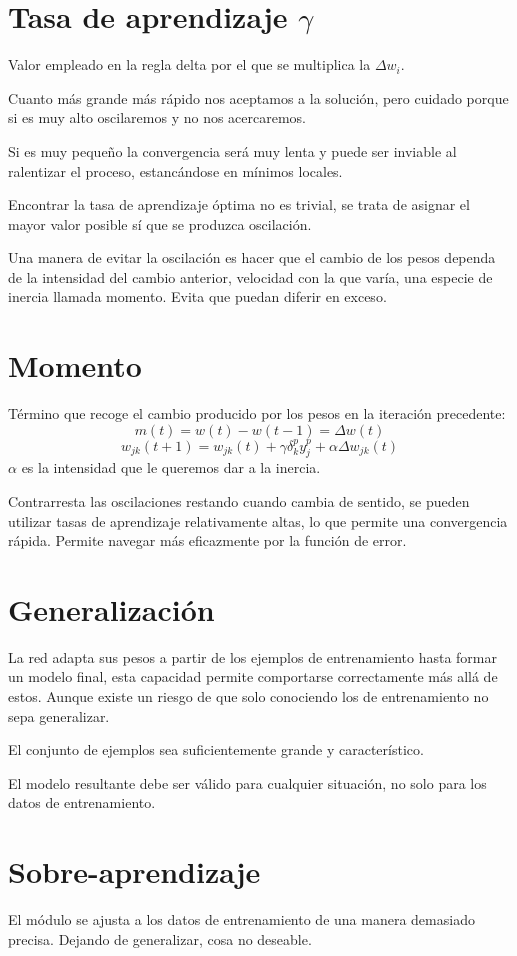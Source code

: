 \documentclass[12pt, twoside, openright]{report} %
\begin{document}
\section{Tasa de aprendizaje $\gamma$}
Valor empleado en la regla delta por el que se multiplica la $\Delta w_i$. 

Cuanto más grande más rápido nos aceptamos a la solución, pero cuidado porque si es muy alto oscilaremos y no nos acercaremos. 

Si es muy pequeño la convergencia será muy lenta y puede ser inviable al ralentizar el proceso, estancándose en mínimos locales.

Encontrar la tasa de aprendizaje óptima no es trivial, se trata de asignar el mayor valor posible  sí que se produzca oscilación.

Una manera de evitar la oscilación es hacer que el cambio de los pesos dependa de  la intensidad del cambio anterior, velocidad con la que varía, una especie de inercia llamada momento. Evita que puedan diferir en exceso.
\pagebreak

\section{Momento}
Término que recoge el cambio producido por los pesos en la iteración precedente:
$$m(t) = w(t) - w(t - 1) = \Delta w(t)$$
$$w_{jk}(t + 1) = w_{jk}(t) + \gamma \delta^p_k y^p_j + \alpha\Delta w_{jk}(t)$$
$\alpha$ es la intensidad que le queremos dar a la inercia.

Contrarresta las oscilaciones restando cuando cambia de sentido, se pueden utilizar tasas de aprendizaje relativamente altas, lo que permite una convergencia rápida. Permite navegar más eficazmente por la función de error.

\section{Generalización}
La red adapta sus pesos a partir de los ejemplos de entrenamiento hasta formar un modelo final, esta capacidad permite comportarse correctamente más allá de estos. Aunque existe un riesgo de que solo conociendo los de entrenamiento no sepa generalizar.

El conjunto de ejemplos sea suficientemente grande y característico.

El modelo resultante debe ser válido para cualquier situación, no solo para los datos de entrenamiento.

\section{Sobre-aprendizaje}
El módulo se ajusta a los datos de entrenamiento de una manera demasiado precisa. Dejando de generalizar, cosa no deseable.
\end{document}
